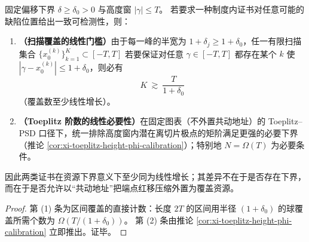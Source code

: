\begin{proposition}\label{prop:xi-toeplitz-vs-scan-linear-lowerbound}
固定偏移下界 \(\delta\ge\delta_0>0\) 与高度窗 \(|\gamma|\le T\)。
若要求一种制度内证书对任意可能的缺陷位置给出一致可检测性，则：
\begin{enumerate}
  \item \textbf{（扫描覆盖的线性门槛）}由于每一峰的半宽为 \(1+\delta_j\ge 1+\delta_0\)，任一有限扫描集合 \(\{x_0^{(k)}\}_{k=1}^{K}\subset[-T,T]\) 若要保证对任意 \(\gamma\in[-T,T]\) 都存在某个 \(k\) 使 \(|\gamma-x_0^{(k)}|\le 1+\delta_0\)，则必有
  \[
  \boxed{\;K\ \gtrsim\ \frac{T}{1+\delta_0}\;}
  \]
  （覆盖数至少线性增长）。
  \item \textbf{（Toeplitz 阶数的线性必要性）}在固定图表（不外置共动地址）的 Toeplitz--PSD 口径下，统一排除高度窗内潜在离切片极点的矩阶满足更强的必要下界（推论 \ref{cor:xi-toeplitz-height-phi-calibration}）；特别地 \(N=\Omega(T)\) 为必要条件。
\end{enumerate}
因此两类证书在资源下界意义下至少同为线性增长；其差异不在于是否存在下界，而在于是否允许以“共动地址”把端点红移压缩外置为覆盖资源。
\end{proposition}

\begin{proof}
第 (1) 条为区间覆盖的直接计数：长度 \(2T\) 的区间用半径 \((1+\delta_0)\) 的球覆盖所需个数为 \(\Omega(T/(1+\delta_0))\)。
第 (2) 条由推论 \ref{cor:xi-toeplitz-height-phi-calibration} 立即推出。证毕。
\end{proof}

